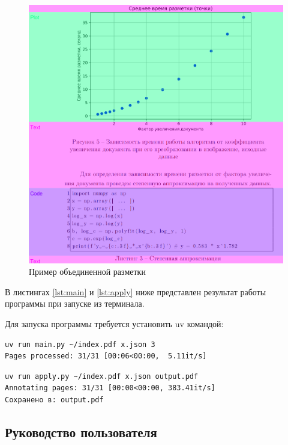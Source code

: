 \begin{figure}[H]
	\centering
	\includegraphics[width=\textwidth]{img/m.merged.png}
    \caption{Пример объединенной разметки}
	\label{fig:merged}
\end{figure}

\newpage

В листингах \ref{lst:main} и \ref{lst:apply} ниже представлен результат работы программы при запуске из терминала.

Для запуска программы требуется установить uv командой:
\begin{lstlisting}[caption={Запуск и результат работы разметки из терминала}, label={lst:main}]
uv run main.py ~/index.pdf x.json 3
Pages processed: 31/31 [00:06<00:00,  5.11it/s]
\end{lstlisting}

\begin{lstlisting}[caption={Запуск и результат применения разметки к PDF из терминала}, label={lst:apply}]
uv run apply.py ~/index.pdf x.json output.pdf
Annotating pages: 31/31 [00:00<00:00, 383.41it/s]
Сохранено в: output.pdf
\end{lstlisting}

\subsection{Руководство пользователя}

